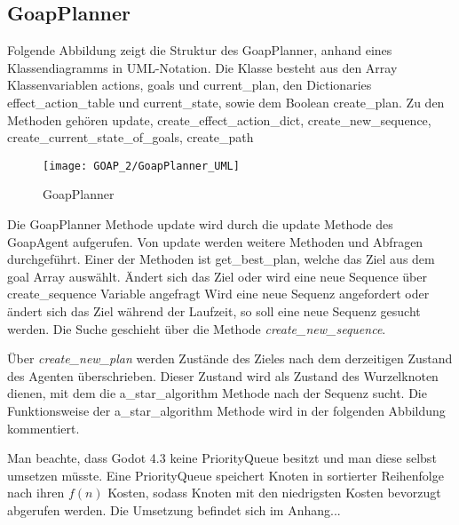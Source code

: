 \subsection{GoapPlanner}

Folgende Abbildung zeigt die Struktur des GoapPlanner, anhand eines Klassendiagramms in UML-Notation. Die Klasse besteht aus den Array Klassenvariablen actions, goals und current\_plan, den Dictionaries effect\_action\_table und current\_state, sowie dem Boolean create\_plan. Zu den Methoden gehören update, create_effect_action_dict, create_new_sequence, create_current_state_of_goals, create_path

\begin{figure}[h]
  \centering
  \texttt{[image: GOAP\_2/GoapPlanner\_UML]}
	\captionsetup{justification=justified, format=plain}
  \caption{GoapPlanner}
  \label{GoapPlanner}
\end{figure}

Die GoapPlanner Methode update wird durch die update Methode des GoapAgent aufgerufen. Von update werden weitere Methoden und Abfragen durchgeführt. Einer der Methoden ist get\_best\_plan, welche das Ziel aus dem goal Array auswählt. Ändert sich das Ziel oder wird eine neue Sequence über create\_sequence Variable angefragt
Wird eine neue Sequenz angefordert oder ändert sich das Ziel während der Laufzeit, so soll eine neue Sequenz gesucht werden. Die Suche geschieht über die Methode \textit{create\_new\_sequence}. 



Über \textit{create\_new\_plan} werden Zustände des Zieles nach dem derzeitigen Zustand des Agenten überschrieben. Dieser Zustand wird als Zustand des Wurzelknoten dienen, mit dem die a\_star\_algorithm Methode nach der Sequenz sucht. Die Funktionsweise der a\_star\_algorithm Methode wird in der folgenden Abbildung kommentiert.



Man beachte, dass Godot 4.3 keine PriorityQueue besitzt und man diese selbst umsetzen müsste. Eine PriorityQueue speichert Knoten in sortierter Reihenfolge nach ihren $f(n)$ Kosten, sodass Knoten mit den niedrigsten Kosten bevorzugt abgerufen werden. Die Umsetzung befindet sich im Anhang...

